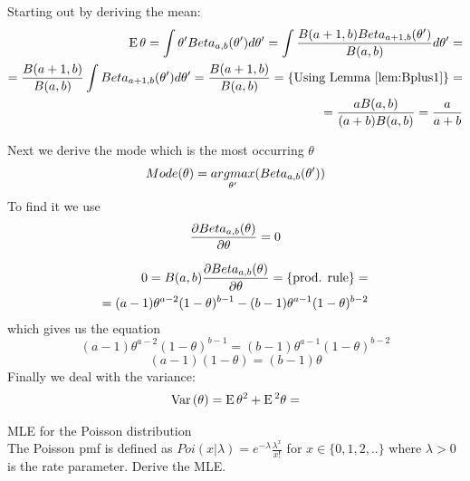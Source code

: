 \documentclass[a4paper,twoside=false,abstract=false,numbers=noenddot,
titlepage=false,headings=small,parskip=half,version=last]{scrartcl}
\begin{document}
\begin{solution}
    Starting out by deriving the mean: 
    \begin{equation}
        \begin{split}
            {\rm E}\,\theta = \int\theta'Beta_{a,b}(\theta')d\theta' =
            \int\frac{B(a+1,b)Beta_{a+1,b}(\theta')}{B(a,b)}d\theta' = \\
            = \frac{B(a+1,b)}{B(a,b)}\int{Beta_{a+1,b}(\theta')d\theta'} =
            \frac{B(a+1,b)}{B(a,b)} = \{\text{Using Lemma \ref{lem:Bplus1}}\}=\\
            =\frac{aB(a,b)}{(a+b)B(a,b)}=\frac{a}{a+b}
        \end{split}
    \end{equation}
    
    Next we derive the mode which is the most occurring $\theta$
    \begin{equation}
        Mode(\theta)=\underset{\theta'}{argmax}(Beta_{a,b}(\theta'))
    \end{equation}
    To find it we use
    \begin{equation}
        \frac{\partial{Beta_{a,b}(\theta)}}{\partial{\theta}}=0
    \end{equation}

    \begin{equation}
        \begin{split}
            0=B(a,b)\frac{\partial{Beta_{a,b}(\theta)}}{\partial{\theta}}=\{\text{prod. rule}\}= \\
            =(a-1)\theta^{a-2}(1-\theta)^{b-1}-(b-1)\theta^{a-1}(1-\theta)^{b-2}
        \end{split}
    \end{equation}
    which gives us the equation
    \begin{equation}
        (a-1)\theta^{a-2}(1-\theta)^{b-1}=(b-1)\theta^{a-1}(1-\theta)^{b-2}
    \end{equation}
    \begin{equation}
        (a-1)(1-\theta)=(b-1)\theta 
    \end{equation}
    Finally we deal with the variance:
    \begin{equation}
        \begin{split}
            {\rm Var}\,(\theta)={\rm E}\,\theta^2+{\rm E}\,^2\theta=
        \end{split}    
    \end{equation}

\end{solution}

\begin{exercise}{3.6} MLE for the Poisson distribution \\
    The Poisson pmf is defined as
    $Poi(x|\lambda)=e^{-\lambda}\frac{\lambda^x}{x!}$ for $x \in \{0,1,2,..\}$
    where $\lambda>0$ is the rate parameter. Derive the MLE. 
\end{exercise}
\begin{solution}

\end{solution}
\end{document}
